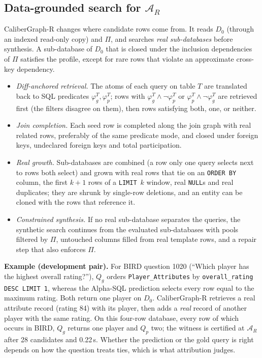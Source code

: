 \subsection{Data-grounded search for $\mathcal A_R$}\label{sec:realsearch}
CaliberGraph-R changes where candidate rows come from. It reads $D_0$ (through an indexed read-only copy) and $\Pi$, and searches \emph{real sub-databases} before synthesis. A sub-database of $D_0$ that is closed under the inclusion dependencies of $\Pi$ satisfies the profile, except for rare rows that violate an approximate cross-key dependency.
\begin{itemize}
\item \emph{Diff-anchored retrieval.} The atoms of each query on table $T$ are translated back to SQL predicates $\varphi_g^T,\varphi_p^T$; rows with $\varphi_g^T\wedge\neg\varphi_p^T$ or $\varphi_p^T\wedge\neg\varphi_g^T$ are retrieved first (the filters disagree on them), then rows satisfying both, one, or neither.
\item \emph{Join completion.} Each seed row is completed along the join graph with real related rows, preferably of the same predicate mode, and closed under foreign keys, undeclared foreign keys and total participation.
\item \emph{Real growth.} Sub-databases are combined (a row only one query selects next to rows both select) and grown with real rows that tie on an \texttt{ORDER BY} column, the first $k{+}1$ rows of a \texttt{LIMIT}~$k$ window, real \texttt{NULL}s and real duplicates; they are shrunk by single-row deletions, and an entity can be cloned with the rows that reference it.
\item \emph{Constrained synthesis.} If no real sub-database separates the queries, the synthetic search continues from the evaluated sub-databases with pools filtered by $\Pi$, untouched columns filled from real template rows, and a repair step that also enforces $\Pi$.
\end{itemize}

\textbf{Example (development pair).} For BIRD question 1020 (``Which player has the highest overall rating?''), $Q_g$ orders \texttt{Player\_Attributes} by \texttt{overall\_rating DESC LIMIT 1}, whereas the Alpha-SQL prediction selects every row equal to the maximum rating. Both return one player on $D_0$. CaliberGraph-R retrieves a real attribute record (rating 84) with its player, then adds a \emph{real} record of another player with the same rating. On this four-row database, every row of which occurs in BIRD, $Q_g$ returns one player and $Q_p$ two; the witness is certified at $\mathcal A_R$ after 28 candidates and 0.22\,s. Whether the prediction or the gold query is right depends on how the question treats ties, which is what attribution judges.
